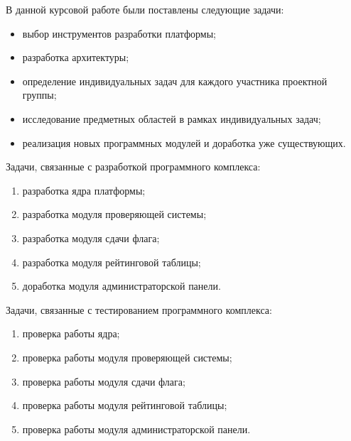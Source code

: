 В данной курсовой работе были поставлены следующие задачи:

\begin{itemize}
\item выбор инструментов разработки платформы;
\item разработка архитектуры;
\item определение индивидуальных задач для каждого участника проектной группы;
\item исследование предметных областей в рамках индивидуальных задач;
\item реализация новых программных модулей и доработка уже существующих.
\end{itemize}

Задачи, связанные с разработкой программного комплекса:

\begin{enumerate}
\item разработка ядра платформы;
\item разработка модуля проверяющей системы;
\item разработка модуля сдачи флага;
\item разработка модуля рейтинговой таблицы;
\item доработка модуля администраторской панели.
\end{enumerate}

Задачи, связанные с тестированием программного комплекса:

\begin{enumerate}
\item проверка работы ядра;
\item проверка работы модуля проверяющей системы;
\item проверка работы модуля сдачи флага;
\item проверка работы модуля рейтинговой таблицы;
\item проверка работы модуля администраторской панели.
\end{enumerate}
